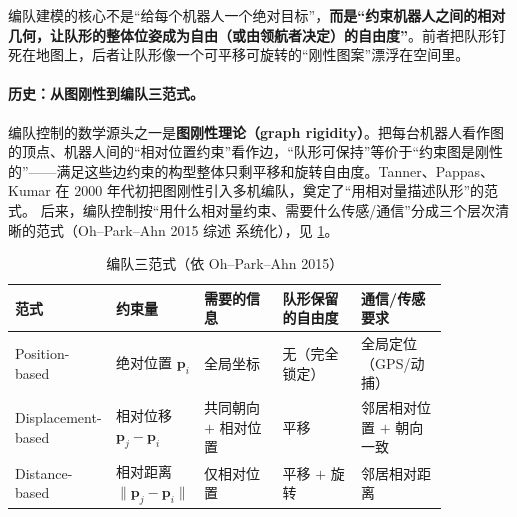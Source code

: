 \begin{insight}\label{ins:dmpc-relative}
编队建模的核心不是“给每个机器人一个绝对目标”，\textbf{而是“约束机器人之间的相对几何，让队形的整体位姿成为自由（或由领航者决定）的自由度”}。前者把队形钉死在地图上，后者让队形像一个可平移可旋转的“刚性图案”漂浮在空间里。
\end{insight}

\paragraph{历史：从图刚性到编队三范式。}
编队控制的数学源头之一是\textbf{图刚性理论（graph rigidity）}。把每台机器人看作图的顶点、机器人间的“相对位置约束”看作边，“队形可保持”等价于“约束图是刚性的”——满足这些边约束的构型整体只剩平移和旋转自由度。Tanner、Pappas、Kumar 在 $2000$ 年代初把图刚性引入多机编队，奠定了“用相对量描述队形”的范式。 后来，编队控制按“用什么相对量约束、需要什么传感/通信”分成三个层次清晰的范式（Oh--Park--Ahn 2015 综述\cite{oh2015formation} 系统化），见 \cref{tab:dmpc-three-paradigm}。

\begin{table}[H]\centering\small
\caption{编队三范式（依 Oh--Park--Ahn 2015\cite{oh2015formation}）}
\label{tab:dmpc-three-paradigm}
\begin{tabular}{p{0.14\linewidth}p{0.16\linewidth}p{0.18\linewidth}p{0.18\linewidth}p{0.20\linewidth}}
\toprule
范式 & 约束量 & 需要的信息 & 队形保留的自由度 & 通信/传感要求 \\
\midrule
Position-based & 绝对位置 $\mathbf{p}_i$ & 全局坐标 & 无（完全锁定） & 全局定位（GPS/动捕） \\
Displacement-based & 相对位移 $\mathbf{p}_j-\mathbf{p}_i$ & 共同朝向 $+$ 相对位置 & 平移 & 邻居相对位置 $+$ 朝向一致 \\
Distance-based & 相对距离 $\|\mathbf{p}_j-\mathbf{p}_i\|$ & 仅相对位置 & 平移 $+$ 旋转 & 邻居相对距离 \\
\bottomrule
\end{tabular}
\end{table}

